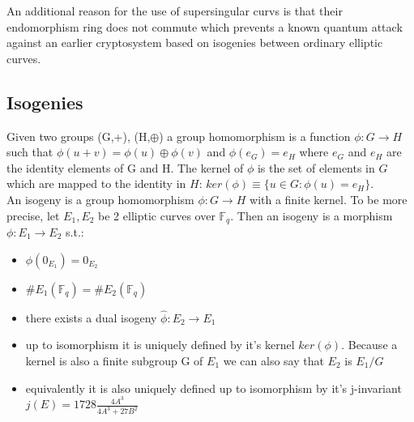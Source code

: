 An additional reason for the use of supersingular curvs is that their endomorphism ring does not commute which prevents a known quantum attack against an earlier cryptosystem based on isogenies between ordinary elliptic curves. 


\subsection{Isogenies}
Given two groups (G,+), (H,$\oplus$) a group homomorphism is a function $\phi: G \to H$ such that $\phi(u + v) = \phi(u) \oplus \phi(v)$ and $\phi(e_G) = e_H$ where $e_G$ and $e_H$ are the identity elements of G and H. The kernel of $\phi$ is the set of elements in $G$ which are mapped to the identity in $H$: $ker(\phi) \equiv \{u\in G:\phi(u)=e_H\}$.\\

An isogeny is a group homomorphism $\phi : G \to H$ with a finite kernel. To be more precise, let $E_1,E_2$ be 2 elliptic curves over $\mathbb{F}_q$. Then an isogeny is a morphism $\phi: E_1 \to E_2$ s.t.:
\begin{itemize}[\textbullet]
	\item $\phi(0_{E_1})= 0_{E_2}$
	\item $\#E_1(\mathbb{F}_q) = \#E_2(\mathbb{F}_q)$
	\item there exists a dual isogeny $\hat{\phi}: E_2 \to E_1$
	\item up to isomorphism it is uniquely defined by it's kernel $ker(\phi)$. Because a kernel is also a finite subgroup G of $E_1$ we can also say that $E_2$ is $E_1/G$
	\item equivalently it is also uniquely defined up to isomorphism by it's j-invariant $j(E)=1728\frac{4A^3}{4A^3+27B^2}$
\end{itemize}


